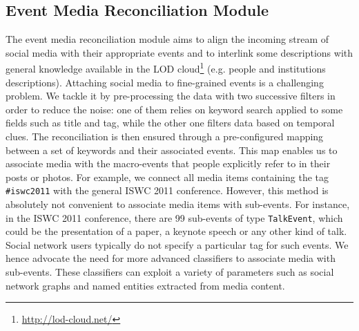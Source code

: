 \subsection{Event Media Reconciliation Module}
The event media reconciliation module aims to align the incoming stream of social media with their appropriate events and to interlink some descriptions with general knowledge available in the LOD cloud\footnote{\url{http://lod-cloud.net/}} (e.g. people and institutions descriptions). Attaching social media to fine-grained events is a challenging problem. We tackle it by pre-processing the data with two successive filters in order to reduce the noise: one of them relies on keyword search applied to some fields such as title and tag, while the other one filters data based on temporal clues. The reconciliation is then ensured through a pre-configured mapping between a set of keywords and their associated events. This map enables us to associate media with the macro-events that people explicitly refer to in their posts or photos. For example, we connect all media items containing the tag \texttt{\#iswc2011} with the general ISWC 2011 conference. However, this method is absolutely not convenient to associate media items with sub-events. For instance, in the ISWC 2011 conference, there are 99 sub-events of type \texttt{TalkEvent}, which could be the presentation of a paper, a keynote speech or any other kind of talk. Social network users typically do not specify a particular tag for such events. We hence advocate the need for more advanced classifiers to associate media with sub-events. These classifiers can exploit a variety of parameters such as social network graphs and named entities extracted from media content. 

